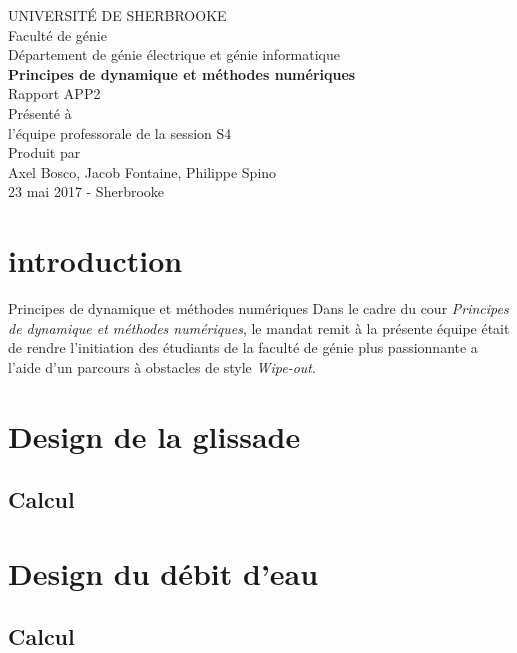 \documentclass[12pt]{article}
\begin{document}
\begin{titlepage}   
	\large
	{
		\begin{center}
			UNIVERSITÉ DE SHERBROOKE\\Faculté de génie\\
			Département de génie électrique et génie informatique\\
			\vspace{3cm}
			{\LARGE\textbf{Principes de dynamique et méthodes numériques}}\\
			\vspace{2cm}
			\LARGE{Rapport APP2}\\
			\vspace{2cm}
			Présenté à\\l'équipe professorale de la session S4\\
			\vspace{2cm}
			Produit par\\Axel Bosco, Jacob Fontaine, Philippe Spino\\
			\vspace{1cm}
			\vfill{23 mai 2017 - Sherbrooke}
		\end{center}
	}
\end{titlepage}

\tableofcontents
\newpage
\onehalfspacing
\section{introduction}
Principes de dynamique et méthodes numériques
Dans le cadre du cour \textit{Principes de dynamique et méthodes numériques}, le mandat remit à la présente équipe était de rendre l'initiation des étudiants de la faculté de génie plus passionnante a l'aide d'un parcours à obstacles de style \textit{Wipe-out}.

\section{Design de la glissade}
\subsection{Calcul}

\section{Design du débit d'eau}
\subsection{Calcul}
\end{document}
